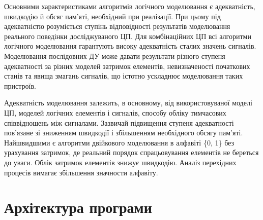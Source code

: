 \documentclass[12pt,a4paper]{article}
\begin{document}
Основними характеристиками алгоритмів логічного моделювання є адекватність, швидкодію й обсяг пам'яті, необхідний при реалізації. При цьому під адекватністю розуміється ступінь відповідності результатів моделювання реального поведінки досліджуваного ЦП. Для комбінаційних ЦП всі алгоритми логічного моделювання гарантують високу адекватність сталих значень сигналів. Моделювання послідовних ДУ може давати результати різного ступеня адекватності за різних моделей затримок елементів, невизначеності початкових станів та явища змагань сигналів, що істотно ускладнює моделювання таких пристроїв.






Адекватність моделювання залежить, в основному, від використовуваної моделі ЦП, моделей логічних елементів і сигналів, способу обліку тимчасових співвідношень між сигналами. Зазвичай підвищення ступеня адекватності пов'язане зі зниженням швидкодії і збільшенням необхідного обсягу пам'яті. Найшвидшими є алгоритми двійкового моделювання в алфавіті \{0, 1\} без урахування затримок, де реальний порядок спрацьовування елементів не береться до уваги. Облік затримок елементів знижує швидкодію. Аналіз перехідних процесів вимагає збільшення значности алфавіту.




\clearpage

\section{Архітектура програми}

\end{document}
